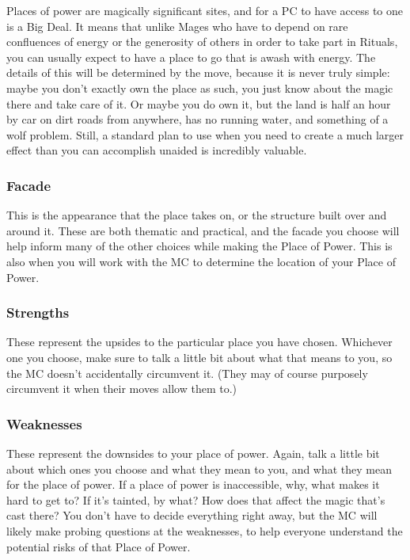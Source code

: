 \documentclass[
  oneside,
  statementpaper,
  9pt]{memoir}
\begin{document}
Places of power are magically significant sites, and for a PC to have
access to one is a Big Deal. It means that unlike Mages who have to
depend on rare confluences of energy or the generosity of others in
order to take part in Rituals, you can usually expect to have a place to
go that is awash with energy. The details of this will be determined by
the move, because it is never truly simple: maybe you don't exactly own
the place as such, you just know about the magic there and take care of
it. Or maybe you do own it, but the land is half an hour by car on dirt
roads from anywhere, has no running water, and something of a wolf
problem. Still, a standard plan to use when you need to create a much
larger effect than you can accomplish unaided is incredibly valuable.

\hypertarget{facade}{%
\subsubsection{Facade}\label{facade}}

This is the appearance that the place takes on, or the structure built
over and around it. These are both thematic and practical, and the
facade you choose will help inform many of the other choices while
making the Place of Power. This is also when you will work with the MC
to determine the location of your Place of Power.

\hypertarget{strengths}{%
\subsubsection{Strengths}\label{strengths}}

These represent the upsides to the particular place you have chosen.
Whichever one you choose, make sure to talk a little bit about what that
means to you, so the MC doesn't accidentally circumvent it. (They may of
course purposely circumvent it when their moves allow them to.)

\hypertarget{weaknesses}{%
\subsubsection{Weaknesses}\label{weaknesses}}

These represent the downsides to your place of power. Again, talk a
little bit about which ones you choose and what they mean to you, and
what they mean for the place of power. If a place of power is
inaccessible, why, what makes it hard to get to? If it's tainted, by
what? How does that affect the magic that's cast there? You don't have
to decide everything right away, but the MC will likely make probing
questions at the weaknesses, to help everyone understand the potential
risks of that Place of Power.
\end{document}
